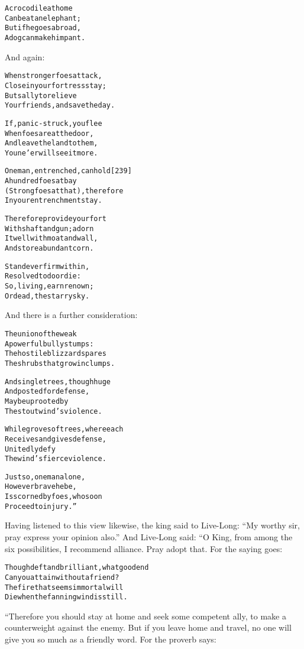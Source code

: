 \documentclass{article}
\renewenvironment{verbatim}{\begin{alltt}\normalfont\begin{centering}}{\end{centering}\end{alltt}}
\begin{document}
\begin{verbatim}
A crocodile at home
    Can beat an elephant;
But if he goes abroad,
    A dog can make him pant.
\end{verbatim}
And again:

\begin{verbatim}
When stronger foes attack,
    Close in your fortress stay;
But sally to relieve
    Your friends, and save the day.

If, panic-struck, you flee
    When foes are at the door,
And leave the land to them,
    You ne'er will see it more.

One man, entrenched, can hold                           [239]
    A hundred foes at bay
(Strong foes at that), therefore
    In your entrenchment stay.

Therefore provide your fort
    With shaft and gun; adorn
It well with moat and wall,
    And store abundant corn.

Stand ever firm within,
    Resolved to do or die:
So, living, earn renown;
    Or dead, the starry sky.
\end{verbatim}
And there is a further consideration:

\begin{verbatim}
The union of the weak
    A powerful bully stumps:
The hostile blizzard spares
    The shrubs that grow in clumps.

And single trees, though huge
    And posted for defense,
May be uprooted by
    The stout wind's violence.

While groves of trees, where each
    Receives and gives defense,
Unitedly defy
    The wind's fierce violence.

Just so, one man alone,
    However brave he be,
Is scorned by foes, who soon
    Proceed to injury.”
\end{verbatim}
Having listened to this view likewise, the king said to Live-Long:
``My worthy sir, pray express your opinion also.'' And Live-Long
said: “O King, from among the six possibilities, I recommend
alliance. Pray adopt that. For the saying goes:

\begin{verbatim}
Though deft and brilliant, what good end
Can you attain without a friend?
The fire that seems immortal will
Die when the fanning wind is still.
\end{verbatim}
“Therefore you should stay at home and seek some competent ally, to
make a counterweight against the enemy. But if you leave home and
travel, no one will give you so much as a friendly word. For the
proverb says:
\end{document}
